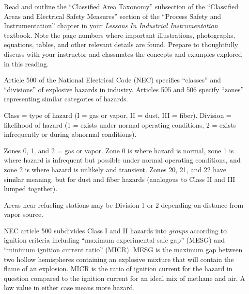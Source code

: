 

Read and outline the ``Classified Area Taxonomy'' subsection of the ``Classified Areas and Electrical Safety Measures'' section of the ``Process Safety and Instrumentation'' chapter in your {\it Lessons In Industrial Instrumentation} textbook.  Note the page numbers where important illustrations, photographs, equations, tables, and other relevant details are found.  Prepare to thoughtfully discuss with your instructor and classmates the concepts and examples explored in this reading.














Article 500 of the National Electrical Code (NEC) specifies ``classes'' and ``divisions'' of explosive hazards in industry.  Articles 505 and 506 specify ``zones'' representing similar categories of hazards.

\vskip 10pt

Class = type of hazard (I = gas or vapor, II = dust, III = fiber).  Division = likelihood of hazard (1 = exists under normal operating conditions, 2 = exists infrequently or during abnormal conditions).

\vskip 10pt

Zones 0, 1, and 2 = gas or vapor.  Zone 0 is where hazard is normal, zone 1 is where hazard is infrequent but possible under normal operating conditions, and zone 2 is where hazard is unlikely and transient.  Zones 20, 21, and 22 have similar meaning, but for dust and fiber hazards (analogous to Class II and III lumped together).

\vskip 10pt

Areas near refueling stations may be Division 1 or 2 depending on distance from vapor source.

\vskip 10pt

NEC article 500 subdivides Class I and II hazards into {\it groups} according to ignition criteria including ``maximum experimental safe gap'' (MESG) and ``minimum ignition current ratio'' (MICR).  MESG is the maximum gap between two hollow hemispheres containing an explosive mixture that will contain the flame of an explosion.  MICR is the ratio of ignition current for the hazard in question compared to the ignition current for an ideal mix of methane and air.  A low value in either case means more hazard.

